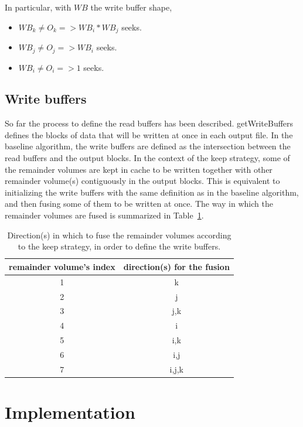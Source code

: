 \documentclass[conference]{IEEEtran}
\begin{document}
In particular, with $WB$ the write buffer shape,
\begin{itemize}
  \item $WB_k \neq O_k => WB_i*WB_j$ seeks.
  \item $WB_j \neq O_j => WB_i$ seeks.
  \item $WB_i \neq O_i => 1$ seeks.
\end{itemize}

\subsection{Write buffers}
So far the process to define the read buffers has been described.
getWriteBuffers defines the blocks of data that will be written at once in each
output file.
In the baseline algorithm, the write buffers are defined as the
intersection between the read buffers and the output blocks.
In the context of the keep strategy, some of the remainder volumes are kept in cache
to be written together with other remainder volume(s) contiguously in the output
blocks.
This is equivalent to initializing the write buffers with the same definition as
in the baseline algorithm, and then fusing some of them to be written at once.
The way in which the remainder volumes are fused is summarized in
Table~\ref{tab:fusion}.

\begin{table}[ht]
  \centering
  \caption{Direction(s) in which to fuse the remainder volumes according to the keep strategy, in order to define the write buffers.}

   \begin{tabular}[t]{ | c | c | }
   \hline
   remainder volume's index & direction(s) for the fusion \\
     \hline\hline
     1 & k \\
     \hline
     2 & j \\
     \hline
     3 & j,k \\
     \hline
     4 & i \\
     \hline
     5 & i,k \\
     \hline
     6 & i,j \\
     \hline
     7 & i,j,k \\
     \hline
   \end{tabular}

   \label{tab:fusion}

\end{table}

\section{Implementation}
\end{document}
